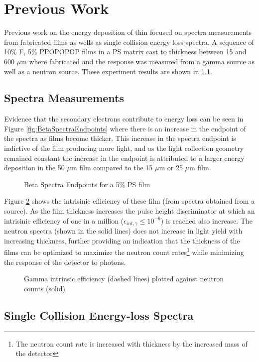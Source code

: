 
\section{Previous Work}
\label{sec:PreviousWork}
Previous work on the energy deposition of thin focused on spectra measurements from fabricated films as wells as single collision energy loss spectra.
A sequence of 10\% F, 5\% PPOPOPOP films in a PS matrix cast to thickness between 15 and 600 $\mu$m where fabricated and the response was measured from a gamma source as well as a neutron source.
These experiment results are shown in \ref{sec:SpectraMeasurements}.


\subsection{Spectra Measurements}
\label{sec:SpectraMeasurements}
Evidence that the secondary electrons contribute to energy loss can be seen in Figure \ref{fig:BetaSpectraEndpoints} where there is an increase in the endpoint of the spectra as films become thicker.
This increase in the spectra endpoint is indictive of the film producing more light, and as the light collection geometry remained constant the increase in the endpoint is attributed to a larger energy deposition in the 50 $\mu$m film compared to the 15 $\mu$m or 25 $\mu$m film.

\begin{figure}
    \centering
    \caption{Beta Spectra Endpoints for a 5\% PS film}
    \label{fig:BetaSpectaEndpoints}
\end{figure}

Figure \ref{fig:GammaIntrNeutronCounts} shows the intrisinic efficiency of these film (from spectra obtained from a  source).
As the film thickness increases the pulse height discriminator at which an intrisinic efficiency of one in a million ($\epsilon_{int,\gamma} \le 10^{-6}$) is reached also increase.
The neutron spectra (shown in the solid lines) does not increase in light yield with increasing thickness, further providing an indication that the thickness of the films can be optimized to maximize the neutron count rates\footnote{The neutron count rate is increased with thickness by the increased mass of the detector} while minimizing the response of the detector to photons.
\begin{figure}
    \centering
    \caption{Gamma intrinsic efficiency (dashed lines) plotted against neutron counts (solid)}
    \label{fig:GammaIntrNeutronCounts}
\end{figure}

\subsection{Single Collision Energy-loss Spectra}
